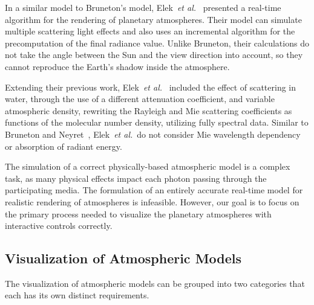 \documentclass[journal]{vgtc}                %
\newcommand{\etal}{\emph{et al.}}
\newcommand{\review}[1]{{\color{blue}#1}}
\begin{document}

In a similar model to Bruneton's model, Elek~\etal~\cite{Elek:2009} presented a real-time algorithm for the rendering of planetary atmospheres. Their model can simulate multiple scattering light effects and also uses an incremental algorithm for the precomputation of the final radiance value. Unlike Bruneton, their calculations do not take the angle between the Sun and the view direction into account, so they cannot reproduce the Earth's shadow inside the atmosphere.

Extending their previous work, Elek~\etal~\cite{Elek:2010} included the effect of scattering in water, through the use of a different attenuation coefficient, and variable atmospheric density, rewriting the Rayleigh and Mie scattering coefficients as functions of the molecular number density, utilizing fully spectral data. Similar to Bruneton and Neyret~\cite{BrunetonNeyret:2008}, Elek~\etal~do not consider Mie wavelength dependency or absorption of radiant energy.


The simulation of a correct physically-based atmospheric model is a complex task, as many physical effects impact each photon passing through the participating media. The formulation of an entirely accurate real-time model for realistic rendering of atmospheres is infeasible. However, our goal is to focus on the primary process needed to visualize the planetary atmospheres with interactive controls correctly.


\subsection{Visualization of Atmospheric Models}
The visualization of atmospheric models can be grouped into two categories that each has its own distinct requirements.
\end{document}
